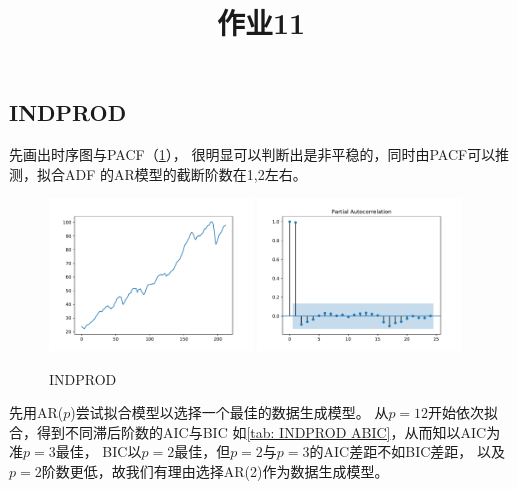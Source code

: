 \documentclass[cn]{homework}
\title{作业11}
\begin{document}
    \maketitle
    \problem

    \problem
    \subsection{INDPROD}
    先画出时序图与PACF（\cref{fig:INDPROD}），
    很明显可以判断出是非平稳的，同时由PACF可以推测，拟合ADF
    的AR模型的截断阶数在1,2左右。
    
    \begin{figure}[h]
        \centering
        \includegraphics[width=0.48\textwidth]{INDPROD-trend}
        \includegraphics[width=0.48\textwidth]{INDPROD-pacf}
        \caption{INDPROD}
        \label{fig:INDPROD}
    \end{figure}

    先用AR($p$)尝试拟合模型以选择一个最佳的数据生成模型。
    从$p=12$开始依次拟合，得到不同滞后阶数的AIC与BIC
    如\cref{tab: INDPROD ABIC}，从而知以AIC为准$p=3$最佳，
    BIC以$p=2$最佳，但$p=2$与$p=3$的AIC差距不如BIC差距，
    以及$p=2$阶数更低，故我们有理由选择AR(2)作为数据生成模型。
\end{document}
